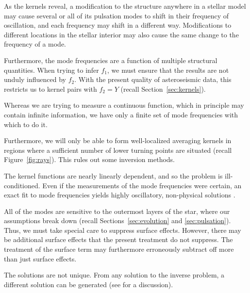\begin{description}
    \setlength{\itemindent}{0px}
    \item[Degeneracy.] As the kernels reveal, a modification to the structure anywhere in a stellar model may cause several or all of its pulsation modes to shift in their frequency of oscillation, and each frequency may shift in a different way. 
    Modifications to different locations in the stellar interior may also cause the same change to the frequency of a mode. 
    
    Furthermore, the mode frequencies are a function of multiple structural quantities. 
    When trying to infer $f_1$, we must ensure that the results are not unduly influenced by $f_2$. 
    With the present quality of asteroseismic data, this restricts us to kernel pairs with ${f_2=Y}$ (recall Section~\ref{sec:kernels}). 
    
    \item[Information Content.] 
    Whereas we are trying to measure a continuous function, which in principle may contain infinite information, we have only a finite set of mode frequencies with which to do it. 
    
    Furthermore, we will only be able to form well-localized averaging kernels in regions where a sufficient number of lower turning points are situated (recall Figure~\ref{fig:rays}). 
    This rules out some inversion methods. 
    
    \item[Stability.]  The kernel functions are nearly linearly dependent, and so the problem is ill-conditioned. 
    Even if the measurements of the mode frequencies were certain, an exact fit to mode frequencies yields highly oscillatory, non-physical solutions \citep[see, e.g.,][]{1990MNRAS.244..542D}. 
    
    \item[Surface Effects.] All of the modes are sensitive to the outermost layers of the star, where our assumptions break down (recall Sections~\ref{sec:evolution} and \ref{sec:pulsation}). 
    Thus, we must take special care to suppress surface effects. 
    However, there may be additional surface effects that the present treatment do not suppress. 
    The treatment of the surface term may furthermore erroneously subtract off more than just surface effects. 
    
    \item[Uniqueness.] The solutions are not unique. 
    From any solution to the inverse problem, a different solution can be generated %
    (see \citealt{GoughThompson1991} for a discussion). 
\end{description}
